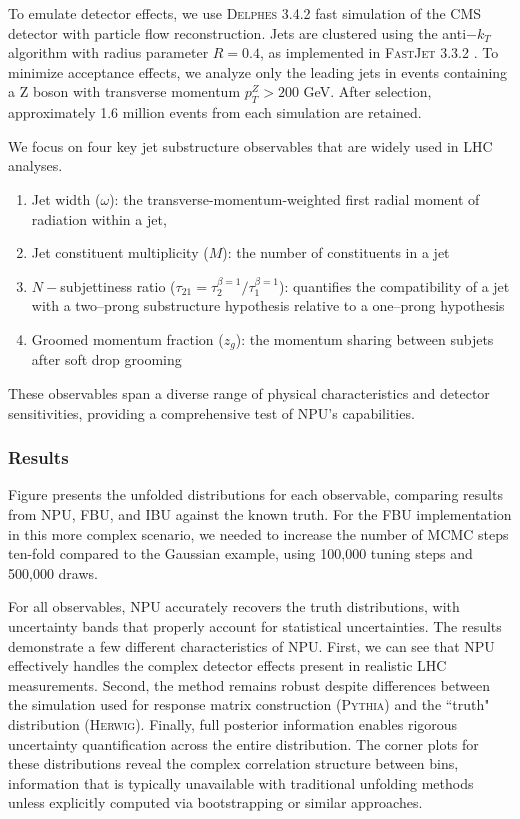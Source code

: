         To emulate detector effects, we use \textsc{Delphes 3.4.2}  fast simulation of the CMS detector with particle flow reconstruction.
        Jets are clustered using the anti$-k_T$ algorithm  with radius parameter $R = 0.4$, as implemented in \textsc{FastJet 3.3.2} .
        To minimize acceptance effects, we analyze only the leading jets in events containing a Z boson with transverse momentum $p_T^Z > 200$ GeV.
        After selection, approximately 1.6 million events from each simulation are retained.

        We focus on four key jet substructure observables that are widely used in LHC analyses.
        \begin{enumerate}
            \item Jet width ($\omega$): the transverse-momentum-weighted first radial moment of radiation within a jet,
            \item Jet constituent multiplicity ($M$): the number of constituents in a jet
            \item \(N-\)subjettiness ratio ($\tau_{21} = \tau_2^{\beta=1}/\tau_1^{\beta=1}$): quantifies the compatibility of a jet with a two--prong substructure hypothesis relative to a one--prong hypothesis 
            \item Groomed momentum fraction ($z_g$): the momentum sharing between subjets after soft drop grooming 
        \end{enumerate}
        These observables span a diverse range of physical characteristics and detector sensitivities, providing a comprehensive test of NPU's capabilities.
    \subsubsection{Results}
        Figure  presents the unfolded distributions for each observable, comparing results from NPU, FBU, and IBU against the known truth.
        For the FBU implementation in this more complex scenario, we needed to increase the number of MCMC steps ten-fold compared to the Gaussian example, using 100,000 tuning steps and 500,000 draws.

        For all observables, NPU accurately recovers the truth distributions, with uncertainty bands that properly account for statistical uncertainties.
        The results demonstrate a few different characteristics of NPU.
        First, we can see that NPU effectively handles the complex detector effects present in realistic LHC measurements.
        Second, the method remains robust despite differences between the simulation used for response matrix construction (\textsc{Pythia}) and the ``truth" distribution (\textsc{Herwig}).
        Finally, full posterior information enables rigorous uncertainty quantification across the entire distribution.
        The corner plots for these distributions  reveal the complex correlation structure between bins, information that is typically unavailable with traditional unfolding methods unless explicitly computed via bootstrapping or similar approaches.

